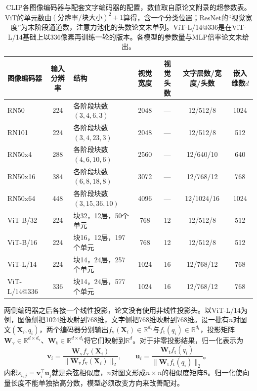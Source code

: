 \begin{table}[tbp]
  \centering
  \small
  \begin{tabularx}{\linewidth}{@{}lcXcccc@{}}
    \toprule
    图像编码器  & 输入分辨率  & 结构  & 视觉宽度  & 视觉头数  & 文字层数/宽度/头数  & 嵌入维数$d$\\
    \midrule
    RN50  & 224  & 各阶段块数$(3,4,6,3)$  & 2048  & —  & 12/512/8  & 1024\\
    RN101  & 224  & 各阶段块数$(3,4,23,3)$  & 2048  & —  & 12/512/8  & 512\\
    RN50x4  & 288  & 各阶段块数$(4,6,10,6)$  & 2560  & —  & 12/640/10  & 640\\
    RN50x16  & 384  & 各阶段块数$(6,8,18,8)$  & 3072  & —  & 12/768/12  & 768\\
    RN50x64  & 448  & 各阶段块数$(3,15,36,10)$  & 4096  & —  & 12/1024/16  & 1024\\
    \midrule
    ViT-B/32  & 224  & 块32，12层，50个单元  & 768  & 12  & 12/512/8  & 512\\
    ViT-B/16  & 224  & 块16，12层，197个单元  & 768  & 12  & 12/512/8  & 512\\
    ViT-L/14  & 224  & 块14，24层，257个单元  & 1024  & 16  & 12/768/12  & 768\\
    ViT-L/14@336  & 336  & 块14，24层，577个单元  & 1024  & 16  & 12/768/12  & 768\\
    \bottomrule
  \end{tabularx}
  \caption{CLIP各图像编码器与配套文字编码器的配置，数值取自原论文附录的超参数表。ViT的单元数由$(\text{分辨率}/\text{块大小})^2+1$算得，含一个分类位置；ResNet的“视觉宽度”为末阶段通道数，注意力池化的头数论文未单列。ViT-L/14@336是在ViT-L/14基础上以336像素再训练一轮的版本。各模型的参数量与MLP倍率论文未给出。}
  \label{tab:vision-models-clip-config}
\end{table}

两侧编码器之后各接一个线性投影，论文没有使用非线性投影头。以ViT-L/14为例，图像侧把1024维映射到768维，文字侧把768维映射到768维。设一批有$n$对图文$(\bm{X}_i,q_i)$，两个编码器分别输出$f_{\mathrm v}(\bm{X}_i)\in\mathbb R^{d_{\mathrm v}}$与$f_{\mathrm t}(q_i)\in\mathbb R^{d_{\mathrm t}}$，投影矩阵$\bm{W}_{\mathrm v}\in\mathbb R^{d\times d_{\mathrm v}}$、$\bm{W}_{\mathrm t}\in\mathbb R^{d\times d_{\mathrm t}}$将它们映射到$\mathbb{R}^d$。对于非零投影结果，归一化表示为
\begin{equation}
  \bm{v}_i=\frac{\bm{W}_{\mathrm v}f_{\mathrm v}(\bm{X}_i)}
                    {\lVert\bm{W}_{\mathrm v}f_{\mathrm v}(\bm{X}_i)\rVert_2},
  \qquad
  \bm{u}_i=\frac{\bm{W}_{\mathrm t}f_{\mathrm t}(q_i)}
                    {\lVert\bm{W}_{\mathrm t}f_{\mathrm t}(q_i)\rVert_2}\text{。}
  \label{eq:vision-clip-embedding}
\end{equation}
内积$s_{i,j}=\bm{v}_i^\top\bm{u}_j$就是余弦相似度，$n$对图文形成$n\times n$的相似度矩阵$\bm S$。归一化使向量长度不能单独抬高分数，模型必须改变方向来改善配对。

